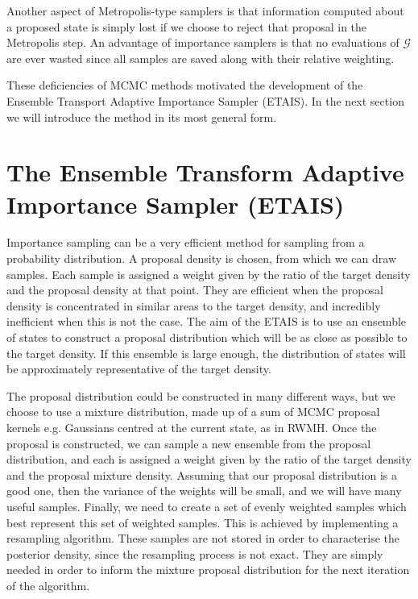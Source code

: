 \documentclass[final]{siamltex}
\newcommand{\revised}{}
\begin{document}
Another aspect of Metropolis-type samplers is that information
computed about a proposed state is simply lost if we choose to reject
that proposal in the Metropolis step. An advantage of importance
samplers is that no evaluations of $\mathcal{G}$ are ever wasted
since all samples are saved along with their relative weighting.

{\revised These deficiencies of MCMC methods
motivated the development of the Ensemble Transport Adaptive Importance Sampler
(ETAIS).}
In the next section we will introduce the method in its most
general form.


\section{The Ensemble Transform Adaptive Importance Sampler \allowbreak (ETAIS)}\label{Sec:ETAIS}

Importance sampling can be a very efficient method for sampling from a
probability distribution. A proposal density is chosen, from which we
can draw samples. Each sample is assigned a weight given by the
ratio of the target density and the proposal density at that
point. They are efficient when the proposal density is concentrated in
similar areas to the target density, and incredibly inefficient when
this is not the case. The aim of the ETAIS is to use an ensemble of states to construct a proposal
distribution which will be as close as possible to the target density. If this
ensemble is large enough, the distribution of states will be
approximately representative
of the target density.

The proposal distribution could be constructed in many different ways,
but we choose to use a mixture distribution, made up of a sum of MCMC
proposal kernels  e.g. Gaussians centred at the current state, as in RWMH. Once the proposal is constructed, we can
sample a new ensemble from the proposal distribution, and each is
assigned a weight given by the ratio of the target density and the
proposal mixture density. Assuming that our proposal distribution is a
good one, then the variance of the weights will be small, and we will
have many useful samples. Finally, we need to create a set of evenly
weighted samples which best represent this set of weighted samples.
This is achieved by implementing a resampling algorithm. These samples
are not stored in order to characterise the posterior density, since
the resampling process {\revised is not exact}. They are
simply needed in order to inform the mixture proposal distribution for the next
iteration of the algorithm. 
\end{document}
